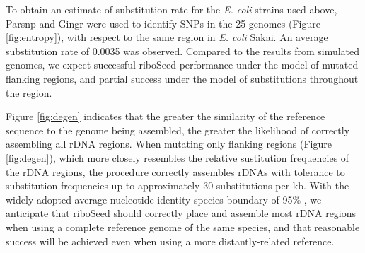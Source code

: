\documentclass[a4,center,fleqn]{NAR}
\begin{document}
To obtain an estimate of substitution rate for the \textit{E. coli} strains used above, Parsnp\cite{Treangen2014} and Gingr\cite{Treangen2014} were used to identify SNPs in the 25 genomes (Figure \ref{fig:entropy}), with respect to the same region in \textit{E. coli} Sakai. An average substitution rate of 0.0035 was observed. Compared to the results from simulated genomes, we expect successful riboSeed performance under the model of mutated flanking regions, and partial success under the model of substitutions throughout the region.


Figure \ref{fig:degen} indicates that the greater the similarity of the reference sequence to the genome being assembled, the greater the likelihood of correctly assembling all rDNA regions. When mutating only flanking regions (Figure \ref{fig:degen}), which more closely resembles the relative sustitution frequencies of the rDNA regions, the procedure correctly assembles rDNAs with tolerance to substitution frequencies up to approximately 30 substitutions per kb.  With the widely-adopted average nucleotide identity species boundary of 95\% \cite{Goris2007a}, we anticipate that riboSeed should correctly place and assemble most rDNA regions when using a complete reference genome of the same species, and that reasonable success will be achieved even when using a more distantly-related reference.
\end{document}
